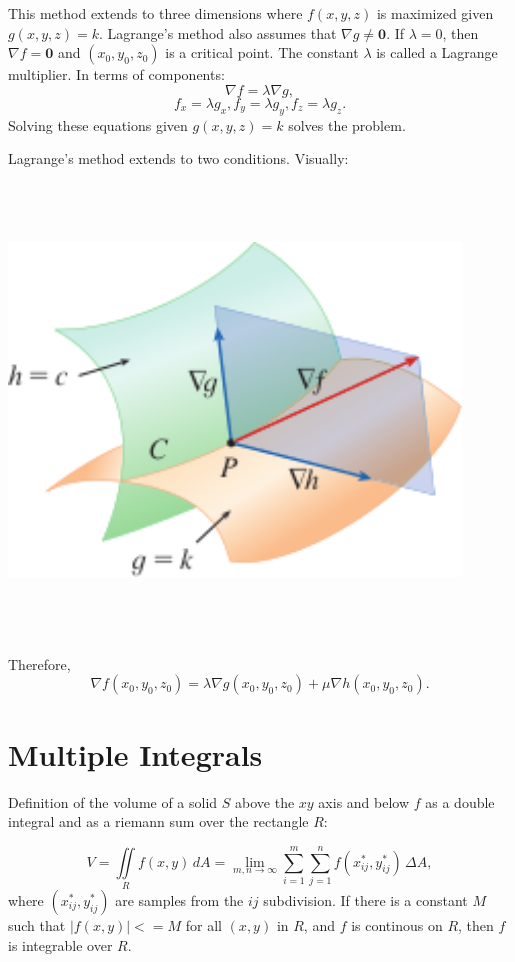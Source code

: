 \documentclass{article}
\begin{document}
This method extends to three dimensions where $f(x,y,z)$ is maximized given
$g(x,y,z)=k$. Lagrange's method also assumes that $\nabla g \neq \mathbf{0}$. If $\lambda = 0$, then $\nabla f = \mathbf{0}$ and $(x_0, y_0, z_0)$
is a critical point. The constant $\lambda$ is called a Lagrange multiplier.
In terms of components:
\[\nabla f = \lambda \nabla g,\]
\[f_x = \lambda g_x, f_y = \lambda g_y, f_z = \lambda g_z.\]
Solving these equations given $g(x,y,z)=k$ solves the problem.

Lagrange's method extends to two conditions. Visually: 
\begin{center}
    \includegraphics[width=12cm,height=12cm, keepaspectratio]{Images/TwoConstantLagrangeMultiplier.png}
\end{center}
Therefore, 
\[\nabla f(x_0,y_0,z_0) = \lambda \nabla g(x_0,y_0,z_0) + \mu \nabla h(x_0,y_0,z_0).\]

\section*{Multiple Integrals}

Definition of the volume of a solid $S$ above the $xy$ axis and below $f$
as a double integral and as a riemann sum over the rectangle $R$:

\[V = \iint\limits_R f(x,y) \,dA = \lim_{m,n \to \infty} \sum_{i=1}^{m} \sum_{j=1}^{n} f(x^*_{ij},y^*_{ij}) \, \Delta A,\]
where $(x^*_{ij},y^*_{ij})$ are samples from the $ij$ subdivision. If 
there is a constant $M$ such that $|f(x,y)| <= M$ for all $(x,y)$ in $R$,
and $f$ is continous on $R$, then $f$ is integrable over $R$.
\end{document}
